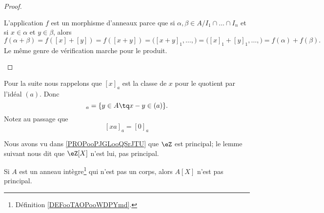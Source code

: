 \begin{proof}
\begin{subproof}
		\spitem[Morphisme]
		L'application \( f\) est un morphisme d'anneaux parce que si \( \alpha,\beta\in A/I_1\cap\ldots\cap I_n\) et si \( x\in \alpha\) et \( y\in \beta\), alors
		\begin{equation}
			f(\alpha+\beta)=f([x]+[y])=f([x+y])=\big( [x+y]_1,\ldots, \big)=\big( [x]_1+[y]_1,\ldots, \big)=f(\alpha)+f(\beta).
		\end{equation}
		Le même genre de vérification marche pour le produit.
	\end{subproof}
\end{proof}

Pour la suite nous rappelons que \( [x]_a\) est la classe de \( x\) pour le quotient par l'idéal \( (a)\). Donc
\begin{equation}
	[x]_a=\{ y\in A\tq x-y\in (a) \}.
\end{equation}
Notez au passage que
\begin{equation}		\label{EQooJAAQooJCcmVE}
	[xa]_a=[0]_a
\end{equation}



Nous avons vu dans \ref{PROPooPJGLooQSrJTU} que \( \eZ\) est principal; le lemme suivant nous dit que \( \eZ[X]\) n'est lui, pas principal.
\begin{lemma}        \label{LEMooDJSUooJWyxCL}
	Si \( A\) est un anneau intègre\footnote{Définition \ref{DEFooTAOPooWDPYmd}.} qui n'est pas un corps, alors \( A[X]\) n'est pas principal.
\end{lemma}

